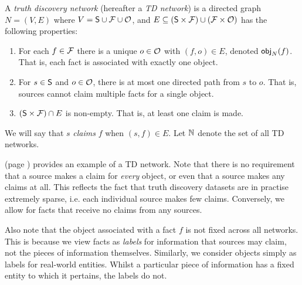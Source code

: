 \begin{definition}
\label{def_td_network}
A \emph{truth discovery network} (hereafter a {\em TD network}) is a directed
graph $N = (V, E)$ where $V = \S \cup \F \cup \O$, and $E \subseteq (\S \times
\F) \cup (\F \times \O)$ has the following properties:

\begin{enumerate}
\item For each $f \in \F$ there is a unique $o \in \O$ with $(f, o) \in
E$, denoted $\obj_N(f)$. That is, each fact is associated with exactly one
object.

\item For $s \in \S$ and $o \in \O$, there is at most one directed path from
$s$ to $o$. That is, sources cannot claim multiple facts for a single object.

\item $(\S \times \F) \cap E$ is non-empty. That is, at least one claim is
made.

\end{enumerate}
We will say that $s$ \emph{claims} $f$ when $(s, f) \in E$. Let $\N$ denote the
set of all TD networks.
\end{definition}

 (page \pageref{td_fig_intro_example}) provides an example
of a TD network.  Note that there is no requirement that a source makes a claim
for \emph{every} object, or even that a source makes any claims at all. This
reflects the fact that truth discovery datasets are in practise extremely
sparse, i.e. each individual source makes few claims. Conversely, we allow for
facts that receive no claims from any sources.

Also note that the object associated with a fact $f$ is not fixed across all
networks. This is because we view facts as \emph{labels} for information that
sources may claim, not the pieces of information themselves. Similarly, we
consider objects simply as labels for real-world entities. Whilst a particular
piece of information has a fixed entity to which it pertains, the labels do
not.\footnotemark{}


